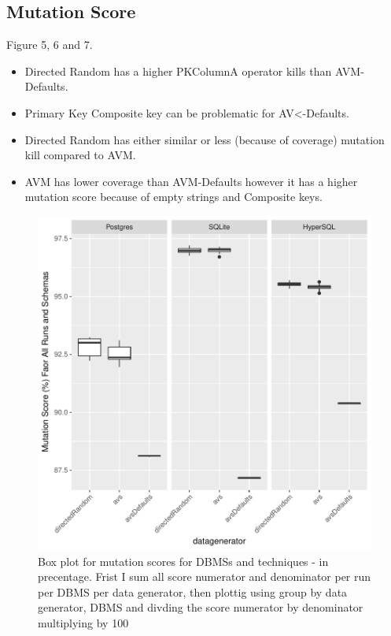 \documentclass[runningheads,a4paper]{llncs}
\begin{document}
\subsection{Mutation Score}\label{mutation-score}

Figure 5, 6 and 7.

\begin{itemize}
	\item Directed Random has a higher PKColumnA operator kills than AVM-Defaults.
	\item Primary Key Composite key can be problematic for AV<-Defaults.
	\item Directed Random has either similar or less (because of coverage) mutation kill compared to AVM.
	\item AVM has lower coverage than AVM-Defaults however it has a higher mutation score because of empty strings and Composite keys.
\end{itemize}

\begin{figure}[h]
\centering
\includegraphics[width=\linewidth]{../plots/figure7.pdf}
\caption{Box plot for mutation scores for DBMSs and techniques - in
precentage. Frist I sum all score numerator and denominator per run per
DBMS per data generator, then plottig using group by data generator,
DBMS and divding the score numerator by denominator multiplying by 100}
\end{figure}
\end{document}
